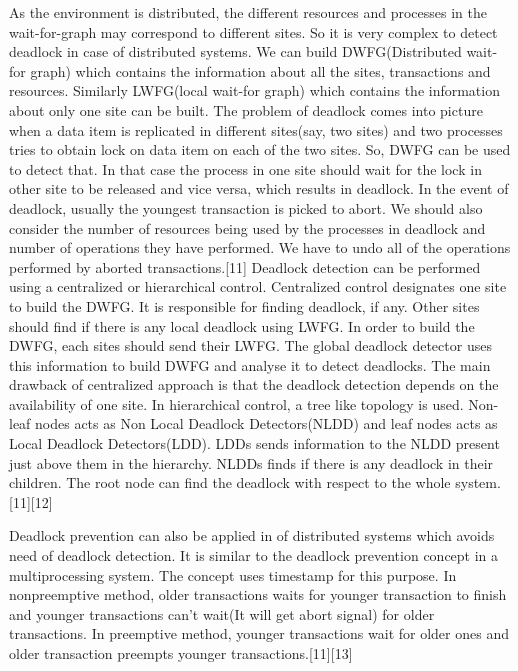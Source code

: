 \documentclass{article}[12pt,a4paper]
\begin{document}
	As the environment is distributed, the different resources and processes in the wait-for-graph may correspond to different sites. So it is very complex to detect deadlock in case of distributed systems. We can build DWFG(Distributed wait-for graph) which contains the information about all the sites, transactions and resources. Similarly LWFG(local wait-for graph) which contains the information about only one site can be built. The problem of deadlock comes into picture when a data item is replicated in different sites(say, two sites) and two processes tries to obtain lock on data item on each of the two sites. So, DWFG can be used to detect that. In that case the process in one site should wait for the lock in other site to be released and vice versa, which results in deadlock. In the event of deadlock, usually the youngest transaction is picked to abort. We should also consider the number of resources being used by the processes in deadlock and number of operations they have performed. We have to undo all of the operations performed by aborted transactions.[11]
	Deadlock detection can be performed using a centralized or hierarchical control. Centralized control designates one site to build the DWFG. It is responsible for finding deadlock, if any. Other sites should find if there is any local deadlock using LWFG. In order to build the DWFG, each sites should send their LWFG. The global deadlock detector uses this information to build DWFG and analyse it to detect deadlocks. The main drawback of centralized approach is that the deadlock detection depends on the availability of one site. In hierarchical control, a tree like topology is used. Non-leaf nodes acts as Non Local Deadlock Detectors(NLDD) and leaf nodes acts as Local Deadlock Detectors(LDD). LDDs sends information to the NLDD present just above them in the hierarchy. NLDDs finds if there is any deadlock in their children. The root node can find the deadlock with respect to the whole system.[11][12]

Deadlock prevention can also be applied in of distributed systems which avoids need of deadlock detection. It is similar to the deadlock prevention concept in a multiprocessing system. The concept uses timestamp for this purpose. In nonpreemptive method, older transactions waits for younger transaction to finish and younger transactions can’t wait(It will get abort signal) for older transactions. In preemptive method, younger transactions wait for older ones and older transaction preempts younger transactions.[11][13]
\end{document}
